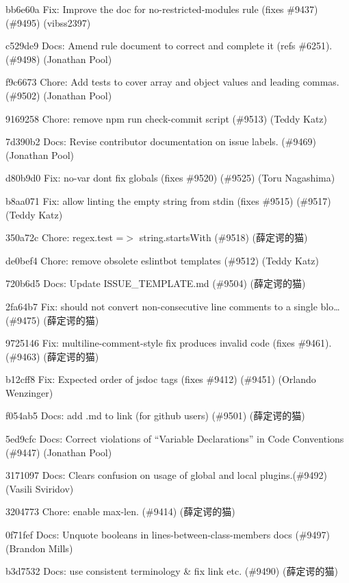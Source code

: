 \begin{DoxyItemize}
\item bb6e60a Fix\+: Improve the doc for no-\/restricted-\/modules rule (fixes \#9437) (\#9495) (vibss2397)
\item c529de9 Docs\+: Amend rule document to correct and complete it (refs \#6251). (\#9498) (Jonathan Pool)
\item f9c6673 Chore\+: Add tests to cover array and object values and leading commas. (\#9502) (Jonathan Pool)
\item 9169258 Chore\+: remove {\ttfamily npm run check-\/commit} script (\#9513) (Teddy Katz)
\item 7d390b2 Docs\+: Revise contributor documentation on issue labels. (\#9469) (Jonathan Pool)
\item d80b9d0 Fix\+: no-\/var don\textquotesingle{}t fix globals (fixes \#9520) (\#9525) (Toru Nagashima)
\item b8aa071 Fix\+: allow linting the empty string from stdin (fixes \#9515) (\#9517) (Teddy Katz)
\item 350a72c Chore\+: regex.\+test =$>$ string.\+starts\+With (\#9518) (薛定谔的猫)
\item de0bef4 Chore\+: remove obsolete eslintbot templates (\#9512) (Teddy Katz)
\item 720b6d5 Docs\+: Update I\+S\+S\+U\+E\+\_\+\+T\+E\+M\+P\+L\+A\+T\+E.\+md (\#9504) (薛定谔的猫)
\item 2fa64b7 Fix\+: should not convert non-\/consecutive line comments to a single blo… (\#9475) (薛定谔的猫)
\item 9725146 Fix\+: multiline-\/comment-\/style fix produces invalid code (fixes \#9461). (\#9463) (薛定谔的猫)
\item b12cff8 Fix\+: Expected order of jsdoc tags (fixes \#9412) (\#9451) (Orlando Wenzinger)
\item f054ab5 Docs\+: add {\ttfamily .md} to link (for github users) (\#9501) (薛定谔的猫)
\item 5ed9cfc Docs\+: Correct violations of “\+Variable Declarations” in Code Conventions (\#9447) (Jonathan Pool)
\item 3171097 Docs\+: Clears confusion on usage of global and local plugins.(\#9492) (Vasili Sviridov)
\item 3204773 Chore\+: enable max-\/len. (\#9414) (薛定谔的猫)
\item 0f71fef Docs\+: Unquote booleans in lines-\/between-\/class-\/members docs (\#9497) (Brandon Mills)
\item b3d7532 Docs\+: use consistent terminology \& fix link etc. (\#9490) (薛定谔的猫)

\end{DoxyItemize}
